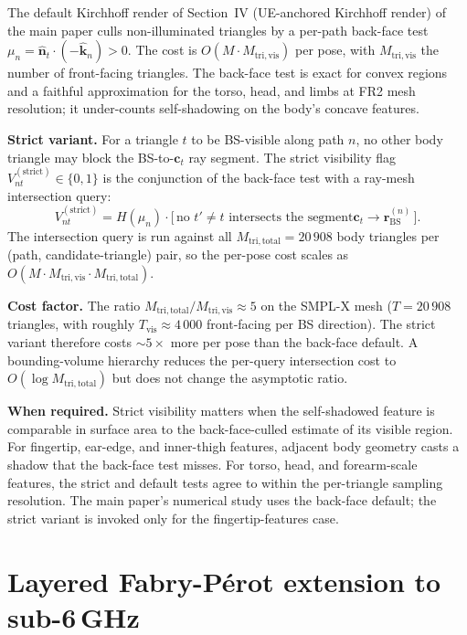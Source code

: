 \documentclass[10pt,journal,twocolumn]{IEEEtran}
\newcommand{\nhat}{\hat{\bm{n}}}
\newcommand{\khat}{\hat{\bm{k}}}
\theoremstyle{plain}
\theoremstyle{definition}
\begin{document}
The default Kirchhoff render of Section~IV (UE-anchored Kirchhoff render) of the main
paper culls non-illuminated triangles by a per-path back-face test
$\mu_n = \nhat_t \cdot (-\khat_n) > 0$. The cost is
$O(M \cdot M_\mathrm{tri,vis})$ per pose, with $M_\mathrm{tri,vis}$
the number of front-facing triangles. The back-face test is exact
for convex regions and a faithful approximation for the torso, head,
and limbs at FR2 mesh resolution; it under-counts self-shadowing on
the body's concave features.

\textbf{Strict variant.} For a triangle $t$ to be BS-visible along
path $n$, no other body triangle may block the BS-to-$\bm{c}_t$ ray
segment. The strict visibility flag
$V^{(\mathrm{strict})}_{nt} \in \{0, 1\}$ is the conjunction of the
back-face test with a ray-mesh intersection query:
\begin{equation}\label{eq:V-strict}
  V^{(\mathrm{strict})}_{nt} = H(\mu_n)
    \cdot \bigl[\,\text{no $t' \neq t$ intersects the segment}
                  \bm{c}_t \to \bm{r}_\mathrm{BS}^{(n)}\,\bigr].
\end{equation}
The intersection query is run against all $M_\mathrm{tri,total} =
20\,908$ body triangles per (path, candidate-triangle) pair, so the
per-pose cost scales as
$O(M \cdot M_\mathrm{tri,vis} \cdot M_\mathrm{tri,total})$.

\textbf{Cost factor.} The ratio
$M_\mathrm{tri,total} / M_\mathrm{tri,vis} \approx 5$ on the SMPL-X
mesh ($T = 20\,908$ triangles, with roughly $T_\mathrm{vis}
\approx 4\,000$ front-facing per BS direction). The strict variant
therefore costs $\sim\!5\times$ more per pose than the back-face
default. A bounding-volume hierarchy reduces the per-query
intersection cost to $O(\log M_\mathrm{tri,total})$ but does not
change the asymptotic ratio.

\textbf{When required.} Strict visibility matters when the
self-shadowed feature is comparable in surface area to the
back-face-culled estimate of its visible region. For fingertip,
ear-edge, and inner-thigh features, adjacent body geometry casts a
shadow that the back-face test misses. For torso, head, and
forearm-scale features, the strict and default tests agree to within
the per-triangle sampling resolution. The main paper's numerical
study uses the back-face default; the strict variant is invoked
only for the fingertip-features case.

\section{Layered Fabry-Pérot extension to sub-6\,GHz}\label{si:fp}
\end{document}
